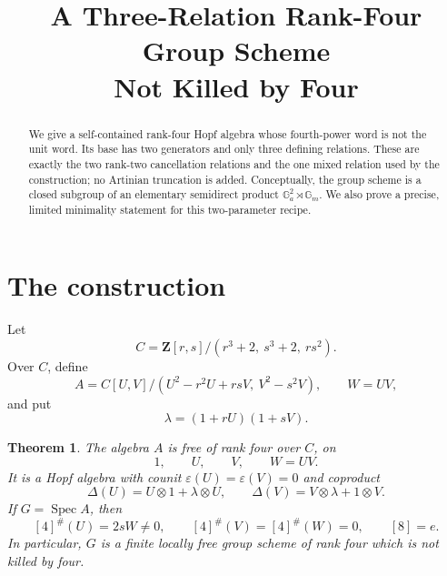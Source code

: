 \documentclass[11pt]{article}
\title{A Three-Relation Rank-Four Group Scheme\\Not Killed by Four}
\author{}
\date{}
\newcommand{\Z}{\mathbf Z}
\newcommand{\ot}{\otimes}
\newcommand{\eps}{\varepsilon}
\newcommand{\Spec}{\operatorname{Spec}}
\newtheorem{theorem}{Theorem}
\theoremstyle{remark}
\begin{document}
\maketitle

\begin{abstract}
We give a self-contained rank-four Hopf algebra whose fourth-power word is
not the unit word.  Its base has two generators and only three defining
relations.  These are exactly the two rank-two cancellation relations and
the one mixed relation used by the construction; no Artinian truncation is
added.  Conceptually, the group scheme is a closed subgroup of an elementary
semidirect product \(\mathbb G_a^2\rtimes\mathbb G_m\).  We also prove a
precise, limited minimality statement for this two-parameter recipe.
\end{abstract}

\begin{center}
\end{center}
\medskip

\section{The construction}

Let
\begin{equation}\label{eq:base}
 C=\Z[r,s]/(r^3+2,\ s^3+2,\ rs^2).
\end{equation}
Over \(C\), define
\begin{equation}\label{eq:A}
 A=C[U,V]/(U^2-r^2U+rsV,\ V^2-s^2V),
 \qquad W=UV,
\end{equation}
and put
\begin{equation}\label{eq:lambda}
 \lambda=(1+rU)(1+sV).
\end{equation}

\begin{theorem}\label{thm:main}
The algebra \(A\) is free of rank four over \(C\), on
\[
 1,\qquad U,\qquad V,\qquad W=UV.
\]
It is a Hopf algebra with counit \(\eps(U)=\eps(V)=0\) and coproduct
\begin{equation}\label{eq:Delta}
 \Delta(U)=U\ot1+\lambda\ot U,
 \qquad
 \Delta(V)=V\ot\lambda+1\ot V.
\end{equation}
If \(G=\Spec A\), then
\begin{equation}\label{eq:powers}
 [4]^\#(U)=2sW\ne0,
 \qquad
 [4]^\#(V)=[4]^\#(W)=0,
 \qquad
 [8]=e.
\end{equation}
In particular, \(G\) is a finite locally free group scheme of rank four
which is not killed by four.
\end{theorem}
\end{document}
